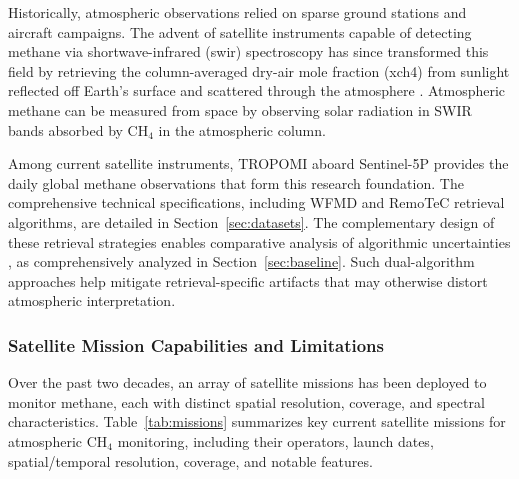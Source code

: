Historically, atmospheric  observations relied on sparse ground stations and aircraft campaigns. The advent of satellite instruments capable of detecting methane via shortwave-infrared (\gls{swir}) spectroscopy has since transformed this field by retrieving the column-averaged dry-air mole fraction (\gls{xch4}) from sunlight reflected off Earth's surface and scattered through the atmosphere \cite{Karoff2023}. Atmospheric methane can be measured from space by observing solar radiation in SWIR bands absorbed by CH$_4$ in the atmospheric column.

Among current satellite instruments, TROPOMI aboard Sentinel-5P provides the daily global methane observations that form this research foundation. The comprehensive technical specifications, including WFMD and RemoTeC retrieval algorithms, are detailed in Section~\ref{sec:datasets}. The complementary design of these retrieval strategies enables comparative analysis of algorithmic uncertainties \cite{Karoff2023}, as comprehensively analyzed in Section~\ref{sec:baseline}. Such dual-algorithm approaches help mitigate retrieval-specific artifacts that may otherwise distort atmospheric interpretation.

\subsubsection{Satellite Mission Capabilities and Limitations}

Over the past two decades, an array of satellite missions has been deployed to monitor methane, each with distinct spatial resolution, coverage, and spectral characteristics. Table~\ref{tab:missions} summarizes key current satellite missions for atmospheric CH$_4$ monitoring, including their operators, launch dates, spatial/temporal resolution, coverage, and notable features.

